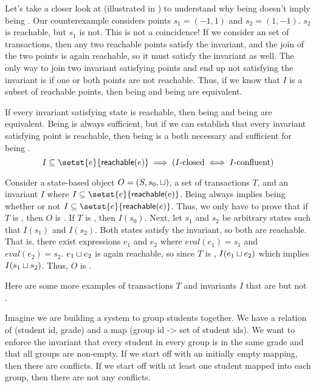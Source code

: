 

Let's take a closer look at  (illustrated in
) to understand why being \Iconfluent{} doesn't
imply being \Iclosed{}. Our counterexample considers points $s_1 = (-1, 1)$ and
$s_2 = (1, -1)$. $s_2$ is reachable, but $s_1$ is not. This is not a
coincidence! If we consider an \Iconfluent{} set of transactions, then any two
reachable points satisfy the invariant, and the join of the two points is again
reachable, so it must satisfy the invariant as well. The only way to join two
invariant satisfying points and end up not satisfying the invariant is if one
or both points are not reachable. Thus, if we know that $I$ is a subset of
reachable points, then being \Iconfluent{} and being \Iclosed{} are equivalent.

\begin{claim}
  If every invariant satisfying state is reachable, then being \Iconfluent{}
  and being \Iclosed{} are equivalent. Being \Iclosed{} is always sufficient,
  but if we can establish that every invariant satisfying point is reachable,
  then being \Iclosed{} is a both necessary and sufficient for being
  \Iconfluent{}.
  \[
    I \subseteq \setst{e}{\reachable{e}} \implies
    (\text{\Iclosed{}} \iff \text{\Iconfluent})
  \]
\end{claim}
\begin{elidableproof}
  Consider a state-based object $O = (S, s_0, \sqcup)$, a set of transactions
  $T$, and an invariant $I$ where $I \subseteq \setst{e}{\reachable{e}}$.
  Being \Iclosed{} always implies being \Iconfluent{} whether or not $I
  \subseteq \setst{e}{\reachable{e}}$. Thus, we only have to prove that if $T$
  is \Iconfluent{}, then $O$ is \Iclosed. If $T$ is \Iconfluent{}, then
  $I(s_0)$. Next, let $s_1$ and $s_2$ be arbitrary states such that $I(s_1)$
  and $I(s_2)$. Both states satisfy the invariant, so both are reachable. That
  is, there exist expressions $e_1$ and $e_2$ where $eval(e_1) = s_1$  and
  $eval(e_2) = s_2$. $e_1 \sqcup e_2$ is again reachable, so since $T$ is
  \Iconfluent{}, $I(e_1 \sqcup e_2)$ which implies $I(s_1 \sqcup s_2)$. Thus, $O$
  is \Iclosed.
\end{elidableproof}

Here are some more examples of transactions $T$ and invariants $I$ that are
\Iconfluent{} but not \Iclosed{}. 

\begin{example}
  Imagine we are building a system to group students together. We have a relation
  of (student id, grade) and a map (group id -> set of student ids). We want to
  enforce the invariant that every student in every group is in the same grade
  and that all groups are non-empty. If we start off with an initially empty
  mapping, then there are conflicts. If we start off with at least one student
  mapped into each group, then there are not any conflicts.
\end{example}

